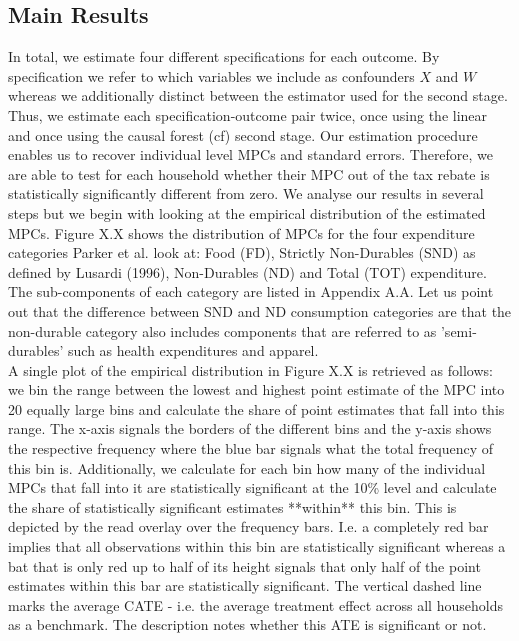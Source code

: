 \subsection{Main Results}
In total, we estimate four different specifications for each outcome. By specification we refer to which variables we include as confounders $X$ and $W$ whereas we additionally distinct between the estimator used for the second stage. Thus, we estimate each specification-outcome pair twice, once using the linear and once using the causal forest (cf) second stage. Our estimation procedure enables us to recover individual level MPCs and standard errors. Therefore, we are able to test for each household whether their MPC out of the tax rebate is statistically significantly different from zero. We analyse our results in several steps but we begin with looking at the empirical distribution of the estimated MPCs. Figure X.X shows the distribution of MPCs for the four expenditure categories Parker et al. look at: Food (FD), Strictly Non-Durables (SND) as defined by Lusardi (1996), Non-Durables (ND) and Total (TOT) expenditure. The sub-components of each category are listed in Appendix A.A. Let us point out that the difference between SND and ND consumption categories are that the non-durable category also includes components that are referred to as 'semi-durables' such as health expenditures and apparel. \\
A single plot of the empirical distribution in Figure X.X is retrieved as follows: we bin the range between the lowest and highest point estimate of the MPC into 20 equally large bins and calculate the share of point estimates that fall into this range. The x-axis signals the borders of the different bins and the y-axis shows the respective frequency where the blue bar signals what the total frequency of this bin is. Additionally, we calculate for each bin how many of the individual MPCs that fall into it are statistically significant at the 10\% level and calculate the share of statistically significant estimates **within** this bin. This is depicted by the read overlay over the frequency bars. I.e. a completely red bar implies that all observations within this bin are statistically significant whereas a bat that is only red up to half of its height signals that only half of the point estimates within this bar are statistically significant. The vertical dashed line marks the average CATE - i.e. the average treatment effect across all households as a benchmark. The description notes whether this ATE is significant or not. \\ 
